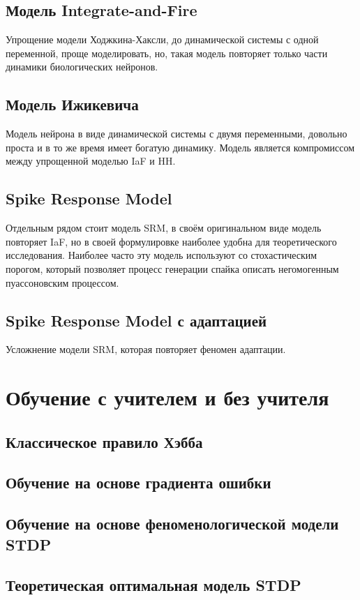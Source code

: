 \documentclass[a4paper,10pt]{article}
\begin{document}
\subsection{Модель Integrate-and-Fire}
Упрощение модели Ходжкина-Хаксли, до динамической системы с одной переменной, проще моделировать, но, такая модель повторяет только части динамики биологических нейронов.

\subsection{Модель Ижикевича}
Модель нейрона в виде динамической системы с двумя переменными, довольно проста и в то же время имеет богатую динамику. Модель является компромиссом между упрощенной моделью IaF и HH. 

\subsection{Spike Response Model}
Отдельным рядом стоит модель SRM, в своём оригинальном виде модель повторяет IaF, но в своей формулировке наиболее удобна для теоретического исследования. Наиболее часто эту модель используют со   стохастическим порогом, который позволяет процесс генерации спайка описать негомогенным пуассоновским процессом.

\subsection{Spike Response Model с адаптацией}
Усложнение модели SRM, которая повторяет феномен адаптации.

\section{Обучение с учителем и без учителя}
\subsection{Классическое правило Хэбба}
\subsection{Обучение на основе градиента ошибки}
\subsection{Обучение на основе феноменологической модели STDP}
\subsection{Теоретическая оптимальная модель STDP}
\end{document}

